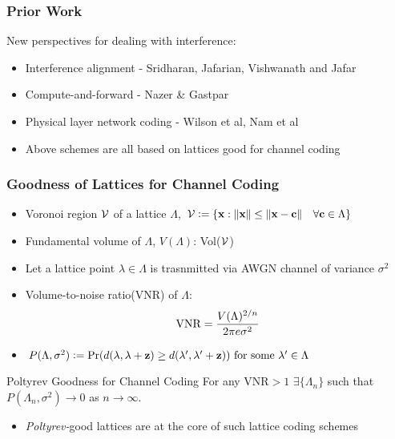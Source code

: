 \documentclass[10pt]{beamer}
\begin{document}
\begin{frame}\frametitle{Prior Work}
New perspectives for dealing with interference:
      \begin{itemize}
     		\item<1-> Interference alignment - Sridharan, Jafarian, Vishwanath and Jafar
			\item<2-> Compute-and-forward - Nazer \& Gastpar
			\item<2-> Physical layer network coding - Wilson et al, Nam et al
      \end{itemize}
			\vspace{2.5em}
			
	\begin{figure}
		\centering
	\end{figure}
\begin{itemize}
	\item Above schemes are all based on lattices {\blue good} for channel coding
\end{itemize}
\end{frame}

\begin{frame}\frametitle{Goodness of Lattices for Channel Coding}
\begin{itemize}
\item Voronoi region $\mathcal{V}$ of a lattice $\Lambda$, $\mathcal{V}\mathrel{\mathop:}= \{\mathbf{x}:\lVert{\mathbf{x}}\rVert\leq \lVert{\mathbf{x-c}}\rVert \quad\forall \mathbf{c}\in\Lambda\}$
\item Fundamental volume of $\Lambda$, $V(\Lambda)$: Vol($\mathcal{V}$)
\item Let a lattice point $\lambda\in\Lambda$ is trasnmitted via AWGN channel of variance $\sigma^2$
\item Volume-to-noise ratio(VNR) of $\Lambda$:
\begin{align*}
\text{VNR}=\frac{V(\Lambda)^{2/n}}{2\pi e\sigma^2}
\end{align*}
\item $P(\Lambda,\sigma^2)\mathrel{\mathop:}= \text{Pr}(d(\lambda,\lambda+\mathbf{z})\geq d(\lambda',\lambda'+\mathbf{z})) \text{ for some } \mathbf{\lambda'}\in\Lambda\ $
\end{itemize}
\begin{block}{Poltyrev Goodness for Channel Coding}
For any VNR$>1$ $\exists \{\Lambda_n\}$ such that $P(\Lambda_n,\sigma^2)\rightarrow 0$ as $n\rightarrow \infty$.
\end{block}
\begin{itemize}
	\item	{\blue \textit{Poltyrev-}good} lattices are at the core of such lattice coding schemes
\end{itemize}
\end{frame}  
\end{document}
